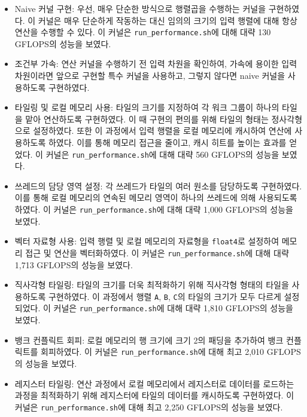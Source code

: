 \begin{itemize}
{        \begin{itemize}
            \item {
                Naive 커널 구현:
                우선, 매우 단순한 방식으로 행렬곱을 수행하는 커널을 구현하였다.
                이 커널은 매우 단순하게 작동하는 대신 임의의 크기의 입력 행렬에 대해 항상 연산을 수행할 수 있다.
                이 커널은 \texttt{run\_performance.sh}에 대해 대략 130 GFLOPS의 성능을 보였다.
            }
            \item {
                조건부 가속:
                연산 커널을 수행하기 전 입력 차원을 확인하여, 가속에 용이한 입력 차원이라면
                앞으로 구현할 특수 커널을 사용하고, 그렇지 않다면 naive 커널을 사용하도록 구현하였다.
            }
            \item {
                타일링 및 로컬 메모리 사용:
                타일의 크기를 지정하여 각 워크 그룹이 하나의 타일을 맡아 연산하도록 구현하였다.
                이 때 구현의 편의를 위해 타일의 형태는 정사각형으로 설정하였다.
                또한 이 과정에서 입력 행렬을 로컬 메모리에 캐시하여 연산에 사용하도록 하였다.
                이를 통해 메모리 접근을 줄이고, 캐시 히트를 높이는 효과를 얻었다.
                이 커널은 \texttt{run\_performance.sh}에 대해 대략 560 GFLOPS의 성능을 보였다.
            }
            \item {
                쓰레드의 담당 영역 설정:
                각 쓰레드가 타일의 여러 원소를 담당하도록 구현하였다.
                이를 통해 로컬 메모리의 연속된 메모리 영역이 하나의 쓰레드에 의해 사용되도록 하였다.
                이 커널은 \texttt{run\_performance.sh}에 대해 대략 1,000 GFLOPS의 성능을 보였다.
            }
            \item {
                벡터 자료형 사용:
                입력 행렬 및 로컬 메모리의 자료형을 \texttt{float4}로 설정하여 메모리 접근 및 연산을 벡터화하였다.
                이 커널은 \texttt{run\_performance.sh}에 대해 대략 1,713 GFLOPS의 성능을 보였다.
            }
            \item {
                직사각형 타일링:
                타일의 크기를 더욱 최적화하기 위해 직사각형 형태의 타일을 사용하도록 구현하였다.
                이 과정에서 행렬 \texttt{A}, \texttt{B}, \texttt{C}의 타일의 크기가 모두 다르게 설정되었다.
                이 커널은 \texttt{run\_performance.sh}에 대해 대략 1,810 GFLOPS의 성능을 보였다.
            }
            \item {
                뱅크 컨플릭트 회피:
                로컬 메모리의 행 크기에 크기 2의 패딩을 추가하여 뱅크 컨플릭트를 회피하였다.
                이 커널은 \texttt{run\_performance.sh}에 대해 최고 2,010 GFLOPS의 성능을 보였다.
            }
            \item {
                레지스터 타일링:
                연산 과정에서 로컬 메모리에서 레지스터로 데이터를 로드하는 과정을 최적화하기 위해
                레지스터에 타일의 데이터를 캐시하도록 구현하였다.
                이 커널은 \texttt{run\_performance.sh}에 대해 최고 2,250 GFLOPS의 성능을 보였다.
            }
            
        \end{itemize}  
    }
    
\end{itemize}